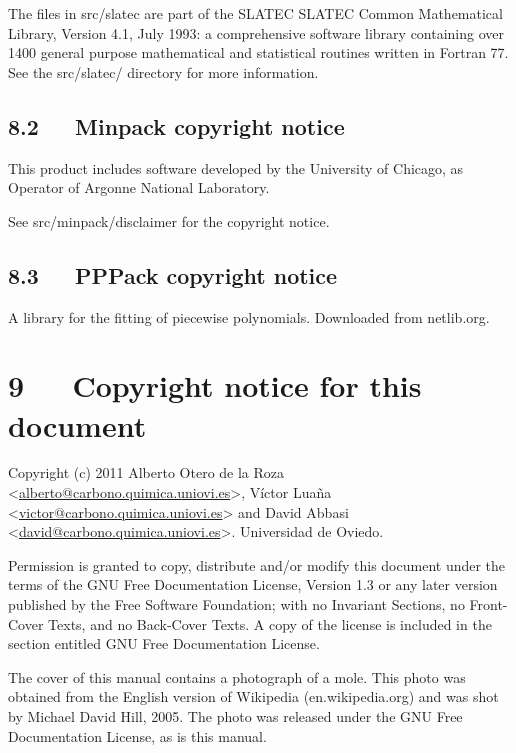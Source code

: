 \documentclass[a4paper]{article}
\begin{document}
The files in src/slatec are part of the SLATEC SLATEC Common
Mathematical Library, Version 4.1, July 1993:
a comprehensive software library containing over
1400 general purpose mathematical and statistical routines
written in Fortran 77. See the src/slatec/ directory for more
information.


\subsection{8.2~~~Minpack copyright notice%
  \label{minpack-copyright-notice}%
}

This product includes software developed by the
University of Chicago, as Operator of Argonne National
Laboratory.

See src/minpack/disclaimer for the copyright notice.


\subsection{8.3~~~PPPack copyright notice%
  \label{pppack-copyright-notice}%
}

A library for the fitting of piecewise polynomials. Downloaded from
netlib.org.


\section{9~~~Copyright notice for this document%
  \label{copyright-notice-for-this-document}%
}

Copyright (c) 2011 Alberto Otero de la Roza <\href{mailto:alberto@carbono.quimica.uniovi.es}{alberto@carbono.quimica.uniovi.es}>,
Víctor Luaña <\href{mailto:victor@carbono.quimica.uniovi.es}{victor@carbono.quimica.uniovi.es}> and David
Abbasi <\href{mailto:david@carbono.quimica.uniovi.es}{david@carbono.quimica.uniovi.es}>. Universidad de Oviedo.

Permission is granted to copy, distribute and/or modify this document
under the terms of the GNU Free Documentation License, Version 1.3 or
any later version published by the Free Software Foundation; with no
Invariant Sections, no Front-Cover Texts, and no Back-Cover Texts.  A
copy of the license is included in the section entitled \textquotedbl{}GNU Free
Documentation License\textquotedbl{}.

The cover of this manual contains a photograph of a mole. This
photo was obtained from the English version of Wikipedia
(en.wikipedia.org) and was shot by Michael David Hill, 2005. The photo
was released under the GNU Free Documentation License, as is this
manual.
\end{document}
